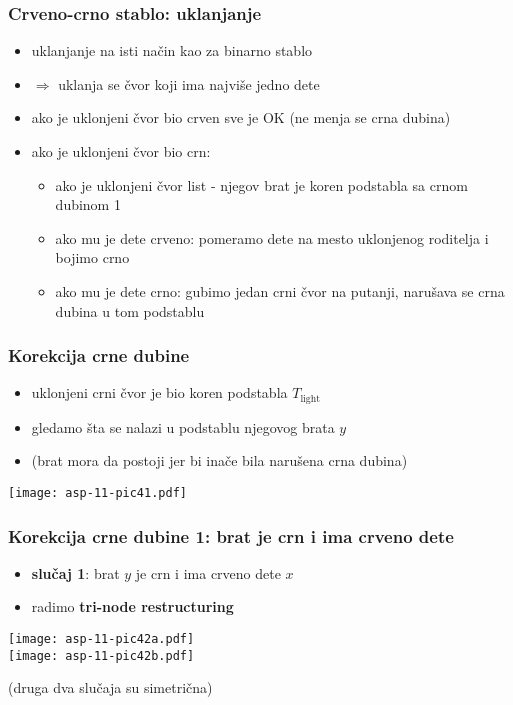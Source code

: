 \documentclass[compress,aspectratio=169]{beamer}
\begin{document}
\begin{frame}[fragile]
  \frametitle{Crveno-crno stablo: uklanjanje}
  \begin{itemize}
    \item uklanjanje na isti način kao za binarno stablo 
    \item $\Rightarrow$ uklanja se čvor koji ima najviše jedno dete
    \item ako je uklonjeni čvor bio crven sve je OK (ne menja se crna dubina)
    \item ako je uklonjeni čvor bio crn:
    \begin{itemize}
      \item ako je uklonjeni čvor list - njegov brat je koren podstabla sa crnom dubinom 1
      \item ako mu je dete crveno: pomeramo dete na mesto uklonjenog roditelja i bojimo crno
      \item ako mu je dete crno: gubimo jedan crni čvor na putanji, narušava se crna dubina u tom podstablu
    \end{itemize}
  \end{itemize}
\end{frame}

\begin{frame}[fragile]
  \frametitle{Korekcija crne dubine}
  \begin{itemize}
    \item uklonjeni crni čvor je bio koren podstabla $T_{\text{light}}$
    \item gledamo šta se nalazi u podstablu njegovog brata $y$ 
    \item (brat mora da postoji jer bi inače bila narušena crna dubina)
  \end{itemize}
  \begin{center}
    \texttt{[image: asp-11-pic41.pdf]}
  \end{center}
\end{frame}

\begin{frame}[fragile]
  \frametitle{Korekcija crne dubine 1: brat je crn i ima crveno dete}
  \begin{itemize}
    \item \textbf{slučaj 1}: brat $y$ je crn i ima crveno dete $x$
    \item radimo \textbf{tri-node restructuring}
  \end{itemize}
  \begin{center}
    \texttt{[image: asp-11-pic42a.pdf]} \\
    \texttt{[image: asp-11-pic42b.pdf]} \\
  \end{center}
  {\scriptsize (druga dva slučaja su simetrična)}
\end{frame}
\end{document}
